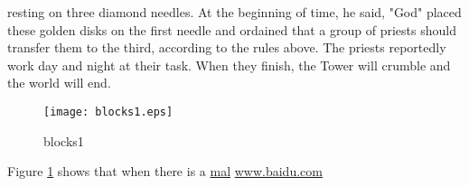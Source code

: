\documentclass[UTF8]{book}
\begin{document}
resting on three diamond needles. At the beginning of time, he said,
"God" placed these golden disks on the first needle and ordained that a
group of priests should transfer them to the third, according to the
rules above. The priests reportedly work day and night at their task.
When they finish, the Tower will crumble and the world will end.

\begin{figure}[H]
	\centering
	\texttt{[image: blocks1.eps]}
	\caption{blocks1 }
	\label{fig:blocks1}
\end{figure}

Figure \ref{fig:blocks1} shows that when there is a \href{www.mail.com}{mal}
\url{www.baidu.com}
\end{document}

